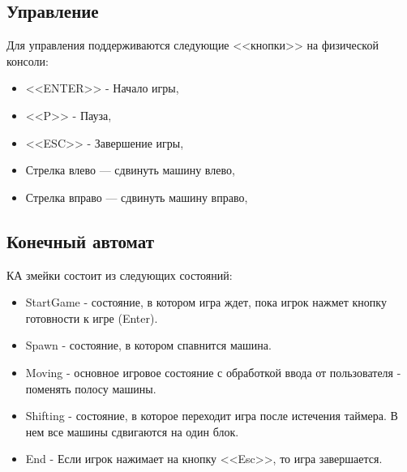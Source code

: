 \documentclass{article}
\begin{document}
\subsection{Управление}
Для управления поддерживаются следующие <<кнопки>> на физической консоли:
\begin{itemize}
    \item <<ENTER>> - Начало игры,
    \item <<P>> - Пауза,
    \item <<ESC>> - Завершение игры,
    \item Стрелка влево — сдвинуть машину влево,
    \item Стрелка вправо — сдвинуть машину вправо,
\end{itemize}

\subsection{Конечный автомат}
КА змейки состоит из следующих состояний:
\begin{itemize}
    \item StartGame - состояние, в котором игра ждет, пока игрок нажмет кнопку готовности к игре (Enter).
    \item Spawn - состояние, в котором спавнится машина.
    \item Moving - основное игровое состояние с обработкой ввода от пользователя - поменять полосу машины.
    \item Shifting - состояние, в которое переходит игра после истечения таймера.
          В нем все машины сдвигаются на один блок.
    \item End - Если игрок нажимает на кнопку <<Esc>>, то игра завершается.
\end{itemize}
\end{document}
